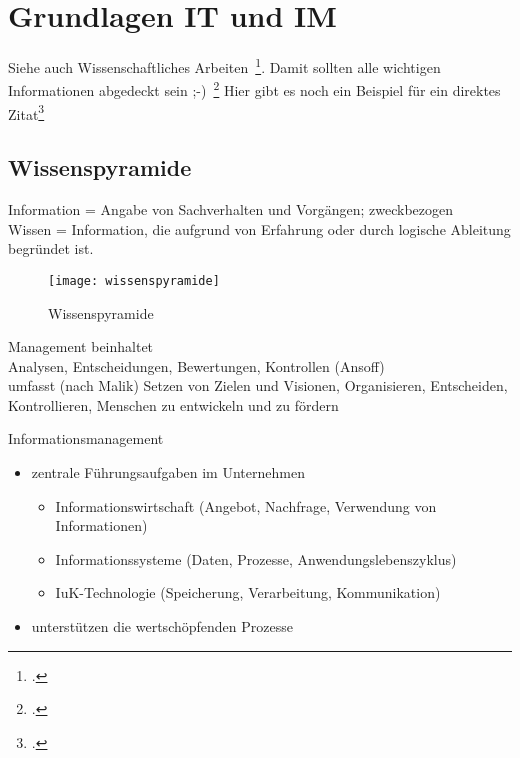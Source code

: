 \newpage
\section{Grundlagen IT und IM} \label{infos}
Siehe auch Wissenschaftliches Arbeiten~\footcite[\vglf][S. 1]{Balzert.2008}. %
Damit sollten alle wichtigen Informationen abgedeckt sein ;-)~\footcite[\vglf][]{Balzert.2008} %
Hier gibt es noch ein Beispiel für ein direktes Zitat\footcite[][]{Balzert.2008} %

\subsection{Wissenspyramide}

Information = Angabe von Sachverhalten und Vorgängen; zweckbezogen
\\Wissen = Information, die aufgrund von Erfahrung oder durch logische Ableitung begründet ist.

\begin{figure}[H]
\caption{Wissenspyramide}
\texttt{[image: wissenspyramide]}
\\
\cite[Quelle: Vgl.][]{FOM}
\end{figure}
Management beinhaltet
\\Analysen, Entscheidungen, Bewertungen, Kontrollen (Ansoff)
\\umfasst (nach Malik) Setzen von Zielen und Visionen, Organisieren, Entscheiden, Kontrollieren, Menschen zu entwickeln und zu fördern

Informationsmanagement
\begin{itemize}
\item zentrale Führungsaufgaben im Unternehmen
\begin{itemize}
    \item Informationswirtschaft (Angebot, Nachfrage, Verwendung von Informationen)
    \item Informationssysteme (Daten, Prozesse, Anwendungslebenszyklus)
    \item IuK-Technologie (Speicherung, Verarbeitung, Kommunikation)
\end{itemize}

\item unterstützen die wertschöpfenden Prozesse
\end{itemize}

